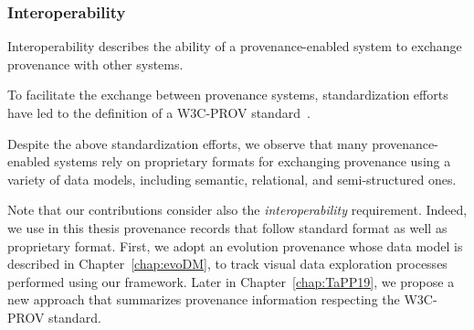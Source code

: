 \subsubsection{Interoperability}
Interoperability describes the ability of a provenance-enabled system to exchange provenance with other systems. %

To facilitate the exchange between provenance systems, standardization efforts have led to the definition of a W3C-PROV standard~\cite{missier:prov13}. 


Despite the above standardization efforts, we observe that many provenance-enabled systems rely on proprietary formats for exchanging provenance using a variety of data models, including semantic, relational, and semi-structured ones.


%

Note that our contributions consider also the \emph{interoperability} requirement. Indeed, we use in this thesis provenance records that follow standard format as well as proprietary format.
First, we adopt an evolution provenance whose data model is described in Chapter~\ref{chap:evoDM}, to track visual data exploration processes performed using our framework. 
Later in Chapter~\ref{chap:TaPP19}, we propose a new approach that summarizes provenance information respecting the W3C-PROV standard.

